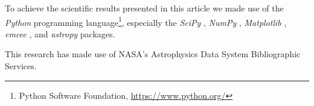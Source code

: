 \documentclass[letterpaper]{ar-1col}
\begin{document}
To achieve the scientific results presented in this article we made use of the \emph{Python} programming language\footnote{Python Software Foundation, \url{https://www.python.org/}}, especially the \emph{SciPy} \citep{virtanen2020}, \emph{NumPy} \citep{numpy}, \emph{Matplotlib} \citep{Matplotlib}, \emph{emcee} \citep{foreman-mackey2013}, and \emph{astropy} \citep{astropy_1,astropy_2} packages.
%

This research has made use of NASA's Astrophysics Data System Bibliographic Services.





\end{document}
